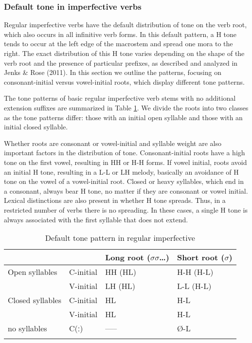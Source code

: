 \subsubsection{Default tone in imperfective verbs}\label{sec:ch11:defaulttone}

Regular imperfective verbs have the default distribution of tone on the verb root, which also occurs in all infinitive verb forms. In this default pattern, a H tone tends to occur at the left edge of the macrostem and spread one mora to the right. The exact distribution of this H tone varies depending on the shape of the verb root and the presence of particular prefixes, as described and analyzed in Jenks \& Rose (2011). In this section we outline the patterns, focusing on consonant-initial versus vowel-initial roots, which display different tone patterns. 

The tone patterns of basic regular imperfective verb stems with no additional extension suffixes are summarized in Table \ref{tab:ch11:5}. We divide the roots into two classes as the tone patterns differ: those with an initial open syllable and those with an initial closed syllable. 

Whether roots are consonant or vowel-initial and syllable weight are also important factors in the distribution of tone. Consonant-initial roots have a high tone on the first vowel, resulting in HH or H-H forms. If vowel initial, roots avoid an initial H tone, resulting in a L-L or LH melody, basically an avoidance of H tone on the vowel of a vowel-initial root. Closed or heavy syllables, which end in a consonant, always bear H tone, no matter if they are consonant or vowel initial. Lexical distinctions are also present in whether H tone spreads. Thus, in a restricted number of verbs there is no spreading. In these cases, a single H tone is always associated with the first syllable that does not extend.

 	\begin{table}
 		\begin{tabular}[t]{llll}
\lsptoprule
		&		& Long root ($\sigma\sigma${\ldots}) & 	Short root ($\sigma$) \\
\midrule
Open syllables	& C-initial	& HH  (HL) 	& 	H-H  (H-L)\\
 				& V-initial	& LH (HL)	& L-L (H-L) \\ 
\midrule 
Closed syllables	& C-initial	&	HL 	&	H-L\\
				& V-initial	&	HL	&	H-L\\
\midrule
no syllables	& C(ː)	& -----	& Ø-L  \\
\lspbottomrule
\end{tabular}
	\caption{Default tone pattern in regular imperfective}
		\label{tab:ch11:5}
\end{table}

